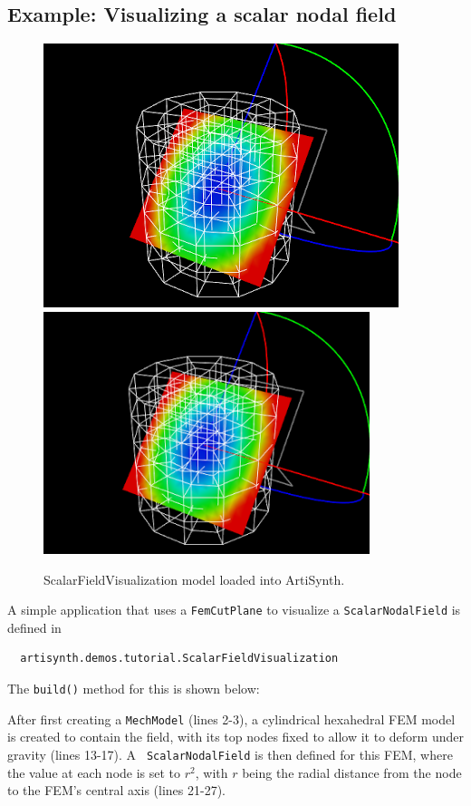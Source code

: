 \subsection{Example: Visualizing a scalar nodal field}
\label{ScalarFieldVisualization:sec}

\begin{figure}[t]
\begin{center}
\iflatexml
 \includegraphics[]{images/ScalarFieldVisualization}
\else
 \includegraphics[width=3.75in]{images/ScalarFieldVisualization}
\fi
\end{center}
\caption{ScalarFieldVisualization model loaded into ArtiSynth.}
\label{ScalarFieldVisualization:fig}
\end{figure}

A simple application that uses a {\tt FemCutPlane} to visualize a
{\tt ScalarNodalField} is defined in
%
\begin{verbatim}
  artisynth.demos.tutorial.ScalarFieldVisualization
\end{verbatim}
%
The {\tt build()} method for this is shown below:
\lstset{numbers=left}
\iflatexml

\else

\fi
\lstset{numbers=none}
%
After first creating a {\tt MechModel} (lines 2-3), a cylindrical
hexahedral FEM model is created to contain the field, with its top
nodes fixed to allow it to deform under gravity (lines 13-17). A {\tt
ScalarNodalField} is then defined for this FEM, where the value at
each node is set to $r^2$, with $r$ being the radial distance from the
node to the FEM's central axis (lines 21-27).

